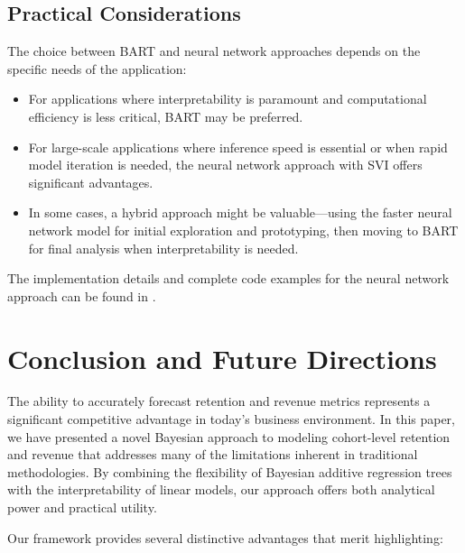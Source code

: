 \documentclass[11pt]{amsart}
\theoremstyle{definition}
\begin{document}
\subsection{Practical Considerations}

The choice between BART and neural network approaches depends on the specific needs of the application:

\begin{itemize}
    \item For applications where interpretability is paramount and computational efficiency is less critical, BART may be
          preferred.

    \item For large-scale applications where inference speed is essential or when rapid model iteration is needed, the neural
          network approach with SVI offers significant advantages.

    \item In some cases, a hybrid approach might be valuable—using the faster neural network model for initial exploration
          and prototyping, then moving to BART for final analysis when interpretability is needed.
\end{itemize}

The implementation details and complete code examples for the neural network approach can be found in
\cite{orduz_revenue_retention_numpyro}.

\section{Conclusion and Future Directions}

The ability to accurately forecast retention and revenue metrics represents a significant competitive advantage in today's
business environment. In this paper, we have presented a novel Bayesian approach to modeling cohort-level retention and
revenue that addresses many of the limitations inherent in traditional methodologies. By combining the flexibility of
Bayesian additive regression trees with the interpretability of linear models, our approach offers both analytical power and
practical utility.

Our framework provides several distinctive advantages that merit highlighting:
\end{document}
